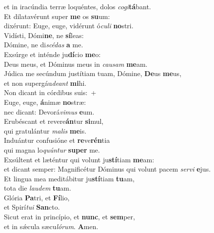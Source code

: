 \oddverse et in iracúndia terræ loquéntes, dolos \textit{co}\textit{gi}\textbf{tá}bant.\\
\evenverse Et dilatavérunt super \textbf{me} os \textbf{su}um:~\*\\
\evenverse dixérunt: Euge, euge, vidérunt ó\textit{cu}\textit{li} \textbf{no}stri.\\
\oddverse Vidísti, Dómi\textbf{ne}, ne \textbf{sí}leas:~\*\\
\oddverse Dómine, ne di\textit{scé}\textit{das} \textbf{a} me.\\
\evenverse Exsúrge et inténde ju\textbf{dí}cio \textbf{me}o:~\*\\
\evenverse Deus meus, et Dóminus meus in \textit{cau}\textit{sam} \textbf{me}am.\\
\oddverse Júdica me secúndum justítiam tuam, Dómine, \textbf{De}us \textbf{me}us,~\*\\
\oddverse et non supergáu\textit{de}\textit{ant} \textbf{mi}hi.\\
\evenverse Non dicant in córdibus suis:~+\\
\evenverse  Euge, euge, \textbf{á}nimæ \textbf{no}stræ:~\*\\
\evenverse nec dicant: Devorá\textit{vi}\textit{mus} \textbf{e}um.\\
\oddverse Erubéscant et revere\textbf{án}tur \textbf{si}mul,~\*\\
\oddverse qui gratulántur \textit{ma}\textit{lis} \textbf{me}is.\\
\evenverse Induántur confusióne et \textbf{re}ve\textbf{rén}tia~\*\\
\evenverse qui magna lo\textit{quún}\textit{tur} \textbf{su}\textbf{per} me.\\
\oddverse Exsúltent et læténtur qui volunt ju\textbf{stí}tiam \textbf{me}am:~\*\\
\oddverse et dicant semper: Magnificétur Dóminus qui volunt pacem \textit{ser}\textit{vi} \textbf{e}jus.\\
\evenverse Et lingua mea meditábitur ju\textbf{stí}tiam \textbf{tu}am,~\*\\
\evenverse tota die \textit{lau}\textit{dem} \textbf{tu}am.\\
\oddverse Glória \textbf{Pa}tri, et \textbf{Fí}lio,~\*\\
\oddverse et Spirí\textit{tu}\textit{i} \textbf{San}cto.\\
\evenverse Sicut erat in princípio, et \textbf{nunc}, et \textbf{sem}per,~\*\\
\evenverse et in sǽcula sæcu\textit{ló}\textit{rum}. \textbf{A}men.\\
